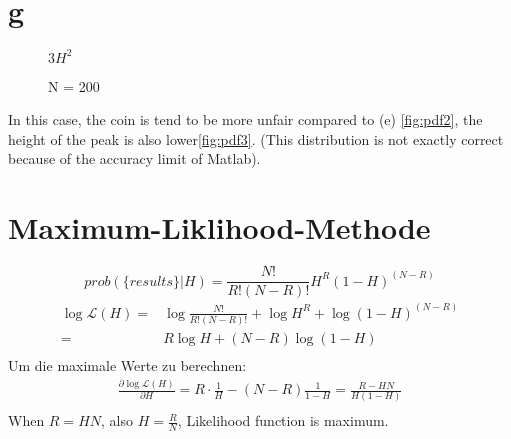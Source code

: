 \section{g}
\begin{figure}[htpb]\centering
	\caption{$3H^2$}
	\label{fig:pdf2}
\end{figure}
\begin{figure}[htpb]\centering
	\caption{N = 200}
	\label{fig:pdf3}
\end{figure}
In this case, the coin is tend to be more unfair compared to (e) \autoref{fig:pdf2}, the height of the peak is also lower\autoref{fig:pdf3}. (This distribution is not exactly correct because of the accuracy limit of Matlab).
\clearpage
\section{Maximum-Liklihood-Methode}
\begin{equation*}
	prob(\{results\}|H) =  \frac{N!}{R!(N-R)!}H^R(1-H)^{(N-R)}
\end{equation*}
\begin{align*}
	\log\mathcal{L}(H) =& \log\frac{N!}{R!(N-R)!} + \log H^R + \log (1-H)^{(N-R)} \\
	=& R \log H + (N-R) \log (1-H) \\
\end{align*}
Um die maximale Werte zu berechnen:
\begin{gather*}
	\frac{\partial \log\mathcal{L}(H)}{\partial H} = R\cdot \frac{1}{H} - (N-R)\frac{1}{1-H} = \frac{R-HN}{H(1-H)} \\
\end{gather*}
When $R = HN$, also $H = \frac{R}{N}$, Likelihood function is maximum.
